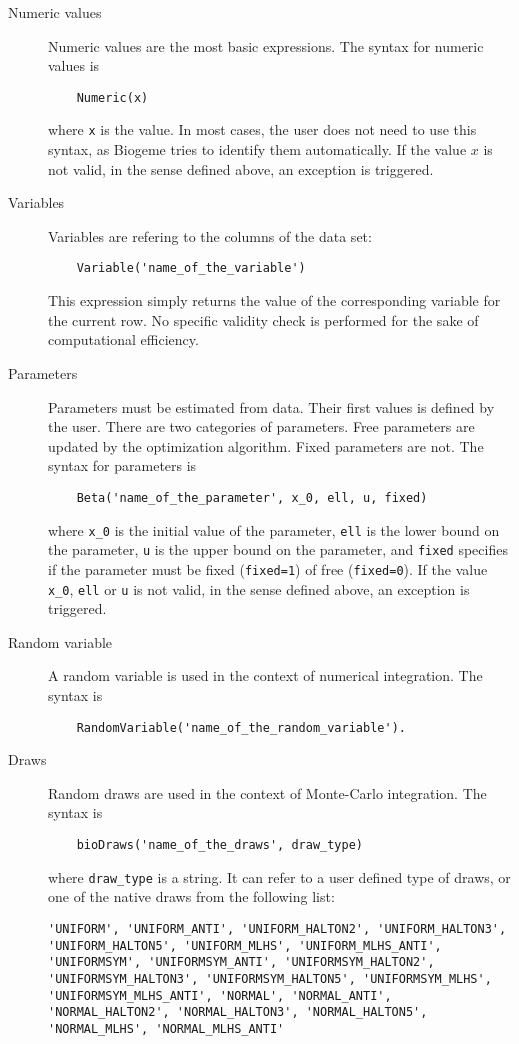 \documentclass[12pt,a4paper]{article}
\begin{document}
\begin{description}
\item[Numeric values] Numeric values are the most basic expressions. The syntax for numeric values is
  \begin{lstlisting}
    Numeric(x)
  \end{lstlisting}
  where \lstinline+x+ is the value. In most cases, the user does not need to use this syntax, as Biogeme tries to identify them automatically.
  If the value $x$ is not valid, in the sense defined above, an exception is triggered.
\item[Variables] Variables are refering to the columns of the data set:
  \begin{lstlisting}
    Variable('name_of_the_variable')
  \end{lstlisting}
  This expression simply returns the value of the corresponding variable for the current row. No specific validity check is performed for the sake of computational efficiency.
\item[Parameters] Parameters must be estimated from data. Their first values is defined by the user. There are two categories of parameters. Free parameters are updated by the optimization algorithm.
  Fixed parameters are not.
  The syntax for parameters is
  \begin{lstlisting}
    Beta('name_of_the_parameter', x_0, ell, u, fixed)
  \end{lstlisting}
  where \lstinline+x_0+ is the initial value of the parameter,
  \lstinline+ell+ is the lower bound on the parameter, \lstinline+u+ is the upper bound on the parameter, and \lstinline+fixed+ specifies if the parameter must be fixed (\lstinline+fixed=1+) of free (\lstinline+fixed=0+).
  If the value \lstinline+x_0+, \lstinline+ell+ or \lstinline+u+  is not valid, in the sense defined above, an exception is triggered.
\item[Random variable] A random variable is used in the context of numerical integration.
  The syntax is
  \begin{lstlisting}
    RandomVariable('name_of_the_random_variable').
  \end{lstlisting}
\item[Draws] Random draws are used in the context of Monte-Carlo integration. 
  The syntax is
  \begin{lstlisting}
    bioDraws('name_of_the_draws', draw_type)
  \end{lstlisting}
  where \lstinline+draw_type+ is a string. It can refer to  a user defined type of draws, or one of the native draws from the following list:
  \begin{lstlisting}
'UNIFORM', 'UNIFORM_ANTI', 'UNIFORM_HALTON2', 'UNIFORM_HALTON3', 'UNIFORM_HALTON5', 'UNIFORM_MLHS', 'UNIFORM_MLHS_ANTI', 'UNIFORMSYM', 'UNIFORMSYM_ANTI', 'UNIFORMSYM_HALTON2', 'UNIFORMSYM_HALTON3', 'UNIFORMSYM_HALTON5', 'UNIFORMSYM_MLHS', 'UNIFORMSYM_MLHS_ANTI', 'NORMAL', 'NORMAL_ANTI', 'NORMAL_HALTON2', 'NORMAL_HALTON3', 'NORMAL_HALTON5', 'NORMAL_MLHS', 'NORMAL_MLHS_ANTI'
  \end{lstlisting}
\end{description}
\end{document}
